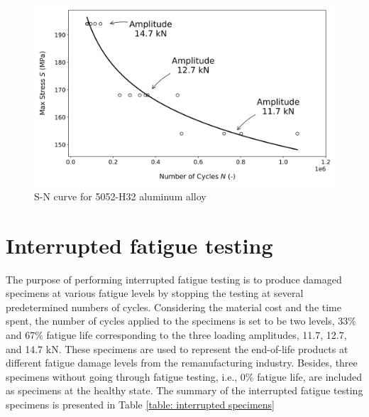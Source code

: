 \begin{figure}[tb]
  \centering
  \includegraphics[width=0.8\linewidth]{fig/sn_curve.png}
  \caption{S-N curve for 5052-H32 aluminum alloy}
  \label{fig: raw sn curve}
\end{figure}

\section{Interrupted fatigue testing}
The purpose of performing interrupted fatigue testing is to produce damaged specimens at various fatigue levels by stopping the testing at several predetermined numbers of cycles. Considering the material cost and the time spent, the number of cycles applied to the specimens is set to be two levels, 33\% and 67\% fatigue life corresponding to the three loading amplitudes, 11.7, 12.7, and 14.7 kN. These specimens are used to represent the end-of-life products at different fatigue damage levels from the remanufacturing industry. Besides, three specimens without going through fatigue testing, i.e., 0\% fatigue life, are included as specimens at the healthy state. The summary of the interrupted fatigue testing specimens is presented in Table \ref{table: interrupted specimens}


